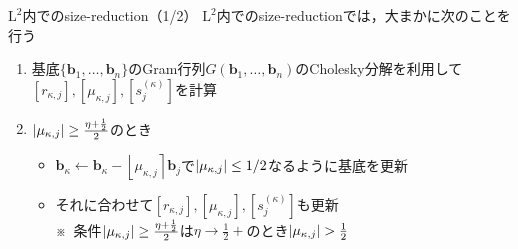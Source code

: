 \documentclass[12pt,aspectratio=169,xcolor=dvipsnames,table,dvipdfmx, leqno]{beamer}
\newcommand{\round}[1]{\left\lfloor #1 \right\rceil}
\begin{document}
\begin{frame}{$\text{L}^2$内でのsize-reduction（1/2）}
$\text{L}^2$内でのsize-reductionでは，大まかに次のことを行う
\begin{enumerate}
    \item 基底$\{\bm{b}_1,\ldots,\bm{b}_n\}$のGram行列$G(\bm{b}_1,\ldots,\bm{b}_n)$のCholesky分解を利用して$[r_{\kappa, j}], [\mu_{\kappa, j}], [s_j^{(\kappa)}]$を計算
    \item $\abs{\mu_{\kappa, j}}\ge \frac{\eta+\frac{1}{2}}{2}$のとき
    \begin{itemize}
        \item $\bm{b}_\kappa\gets \bm{b}_\kappa-\round{\mu_{\kappa, j}}\bm{b}_j$で$\abs{\mu_{\kappa, j}}\le 1/2$なるように基底を更新
        \item それに合わせて$[r_{\kappa, j}], [\mu_{\kappa, j}], [s_j^{(\kappa)}]$も更新\\
        \quad\quad\quad※~条件$\abs{\mu_{\kappa, j}}\ge \frac{\eta+\frac{1}{2}}{2}$は$\eta\to\frac{1}{2}+$のとき$\abs{\mu_{\kappa, j}}> \frac{1}{2}$ 
    \end{itemize}
\end{enumerate}
\end{frame}
\end{document}
